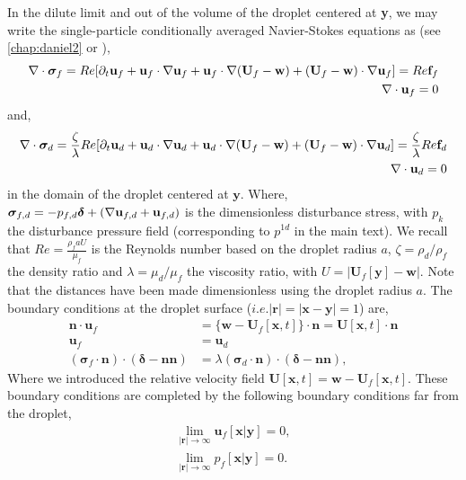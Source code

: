 In the dilute limit and out of the volume of the droplet centered at \textbf{y}, we may write the single-particle conditionally averaged Navier-Stokes equations as (see \ref{chap:daniel2} or \citet{stone2001inertial}),  
\begin{align*}
    \mathbf{\nabla}\cdot\bm\sigma_f
    = 
    Re [
    \partial_t \textbf{u}_f
    + \textbf{u}_f\cdot \mathbf{\nabla} \textbf{u}_f
    + \textbf{u}_f\cdot \mathbf{\nabla} (\textbf{U}_f - \textbf{w})
    + (\textbf{U}_f - \textbf{w})\cdot \mathbf{\nabla} \textbf{u}_f]
    = Re \textbf{f}_f\\
    \mathbf{\nabla}\cdot \textbf{u}_f = 0
\end{align*}
and, 
\begin{align*}
    \mathbf{\nabla}\cdot\bm\sigma_d
    = 
    \frac{\zeta}{\lambda}Re [
    \partial_t \textbf{u}_d
    + \textbf{u}_d\cdot \mathbf{\nabla} \textbf{u}_d
    + \textbf{u}_d\cdot \mathbf{\nabla} (\textbf{U}_f - \textbf{w})
    + (\textbf{U}_f - \textbf{w})\cdot \mathbf{\nabla} \textbf{u}_d]
    = \frac{\zeta}{\lambda}Re \textbf{f}_d\\
    \mathbf{\nabla}\cdot \textbf{u}_d = 0
\end{align*}
in the domain of the droplet centered at $\textbf{y}$. 
Where, $\bm\sigma_{f,d} = -p_{f,d}\bm\delta + (\mathbf{\nabla} \textbf{u}_{f,d} + \textbf{u}_{f,d})$ is the dimensionless disturbance stress, with $p_k$ the disturbance pressure field (corresponding to $p^{1d}$ in the main text). 
We recall that $Re = \frac{\rho_f a U}{\mu_f}$ is the Reynolds number based on the droplet radius $a$, $\zeta = \rho_d / \rho_f$ the density ratio and $\lambda = \mu_d / \mu_f$ the viscosity ratio, with $U = |\textbf{U}_f[\textbf{y}] - \textbf{w}|$. 
Note that the distances have been made dimensionless using the droplet radius $a$. 
The boundary conditions at the droplet surface ($i.e. |\textbf{r}| = |\textbf{x} - \textbf{y}| = 1$) are, 
\begin{align}
    \textbf{n}\cdot\textbf{u}_f
    &= \{\textbf{w} - \textbf{U}_f[\textbf{x},t]\}\cdot \textbf{n} 
    = \textbf{U}[\textbf{x},t]\cdot \textbf{n} \\
    \textbf{u}_f &= \textbf{u}_d\\
    (\bm\sigma_f\cdot\textbf{n})\cdot (\bm\delta - \textbf{nn})
    &= \lambda (\bm\sigma_d\cdot \textbf{n})\cdot (\bm\delta - \textbf{nn}),
    \label{eq:bc_stress_orig}
\end{align}
Where we introduced the relative velocity field $\textbf{U}[\textbf{x},t] = \textbf{w} - \textbf{U}_f[\textbf{x},t]$. 
These boundary conditions are completed by the following boundary conditions far from the droplet,
\begin{align*}
    \lim_{|\textbf{r}|\to\infty }\textbf{u}_f[\textbf{x}|\textbf{y}] = 0,\\
    \lim_{|\textbf{r}|\to\infty }p_f[\textbf{x}|\textbf{y}] = 0. 
\end{align*}

